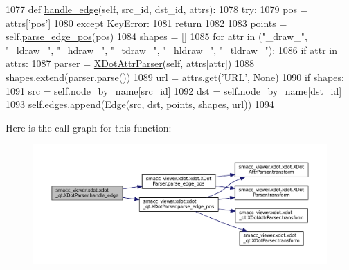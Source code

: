 \begin{DoxyCode}
1077     \textcolor{keyword}{def }\hyperlink{classsmacc__viewer_1_1xdot_1_1xdot__qt_1_1XDotParser_a941fa1a5ed35126c903e44d2a5b97367}{handle\_edge}(self, src\_id, dst\_id, attrs):
1078         \textcolor{keywordflow}{try}:
1079             pos = attrs[\textcolor{stringliteral}{'pos'}]
1080         \textcolor{keywordflow}{except} KeyError:
1081             \textcolor{keywordflow}{return}
1082 
1083         points = self.\hyperlink{classsmacc__viewer_1_1xdot_1_1xdot__qt_1_1XDotParser_acd1d89d13fa8fdd48d7d23c8b72dd2f9}{parse\_edge\_pos}(pos)
1084         shapes = []
1085         \textcolor{keywordflow}{for} attr \textcolor{keywordflow}{in} (\textcolor{stringliteral}{"\_draw\_"}, \textcolor{stringliteral}{"\_ldraw\_"}, \textcolor{stringliteral}{"\_hdraw\_"}, \textcolor{stringliteral}{"\_tdraw\_"}, \textcolor{stringliteral}{"\_hldraw\_"}, \textcolor{stringliteral}{"\_tldraw\_"}):
1086             \textcolor{keywordflow}{if} attr \textcolor{keywordflow}{in} attrs:
1087                 parser = \hyperlink{classsmacc__viewer_1_1xdot_1_1xdot__qt_1_1XDotAttrParser}{XDotAttrParser}(self, attrs[attr])
1088                 shapes.extend(parser.parse())
1089         url = attrs.get(\textcolor{stringliteral}{'URL'}, \textcolor{keywordtype}{None})
1090         \textcolor{keywordflow}{if} shapes:
1091             src = self.\hyperlink{classsmacc__viewer_1_1xdot_1_1xdot__qt_1_1XDotParser_ab2f76c5c90e5bfea7a8f539698180c97}{node\_by\_name}[src\_id]
1092             dst = self.\hyperlink{classsmacc__viewer_1_1xdot_1_1xdot__qt_1_1XDotParser_ab2f76c5c90e5bfea7a8f539698180c97}{node\_by\_name}[dst\_id]
1093             self.edges.append(\hyperlink{classsmacc__viewer_1_1xdot_1_1xdot__qt_1_1Edge}{Edge}(src, dst, points, shapes, url))
1094 
\end{DoxyCode}


Here is the call graph for this function\+:
\nopagebreak
\begin{figure}[H]
\begin{center}
\leavevmode
\includegraphics[width=350pt]{classsmacc__viewer_1_1xdot_1_1xdot__qt_1_1XDotParser_a941fa1a5ed35126c903e44d2a5b97367_cgraph}
\end{center}
\end{figure}


